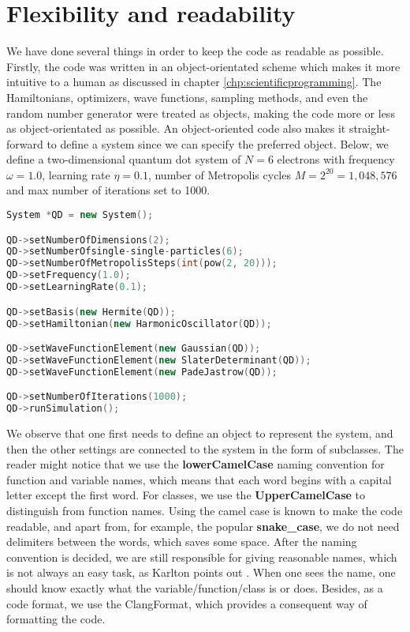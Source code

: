 \section{Flexibility and readability}
We have done several things in order to keep the code as readable as possible. Firstly, the code was written in an object-orientated scheme which makes it more intuitive to a human as discussed in chapter \ref{chp:scientificprogramming}. The Hamiltonians, optimizers, wave functions, sampling methods, and even the random number generator were treated as objects, making the code more or less as object-orientated as possible. An object-oriented code also makes it straight-forward to define a system since we can specify the preferred object. Below, we define a two-dimensional quantum dot system of $N=6$ electrons with frequency $\omega=1.0$, learning rate $\eta=0.1$, number of Metropolis cycles $M=2^{20}=1,048,576$ and max number of iterations set to 1000.

\begin{lstlisting}[language={C++}, caption={Example on how a quantum dot system can be initialized.}, label={lst:qd}]
System *QD = new System();

QD->setNumberOfDimensions(2);
QD->setNumberOfsingle-single-particles(6);
QD->setNumberOfMetropolisSteps(int(pow(2, 20)));
QD->setFrequency(1.0);
QD->setLearningRate(0.1);

QD->setBasis(new Hermite(QD));
QD->setHamiltonian(new HarmonicOscillator(QD));

QD->setWaveFunctionElement(new Gaussian(QD));
QD->setWaveFunctionElement(new SlaterDeterminant(QD));
QD->setWaveFunctionElement(new PadeJastrow(QD));

QD->setNumberOfIterations(1000);
QD->runSimulation();
\end{lstlisting}
We observe that one first needs to define an object to represent the system, and then the other settings are connected to the system in the form of subclasses. The reader might notice that we use the \textbf{lowerCamelCase} naming convention for function and variable names, which means that each word begins with a capital letter except the first word. For classes, we use the \textbf{UpperCamelCase} to distinguish from function names. Using the camel case is known to make the code readable, and apart from, for example, the popular \textbf{snake\_case}, we do not need delimiters between the words, which saves some space. After the naming convention is decided, we are still responsible for giving reasonable names, which is not always an easy task, as Karlton points out \cite{fowler_bliki:_nodate}. When one sees the name, one should know exactly what the variable/function/class is or does. Besides, as a code format, we use the ClangFormat, which provides a consequent way of formatting the code. 

